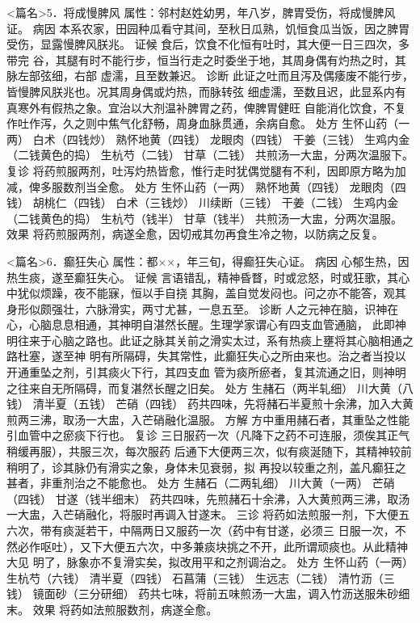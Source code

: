 \documentclass[a4paper,12pt,UTF8,twoside]{ctexbook}
\begin{document}
<篇名>5．将成慢脾风
属性：邻村赵姓幼男，年八岁，脾胃受伤，将成慢脾风证。 
病因 本系农家，田园种瓜看守其间，至秋日瓜熟，饥恒食瓜当饭，因之脾胃受伤，显露慢脾风朕兆。 
证候 食后，饮食不化恒有吐时，其大便一日三四次，多带完 
谷，其腿有时不能行步，恒当行走之时委坐于地，其周身偶有灼热之时，其脉左部弦细，右部 
虚濡，且至数兼迟。 
诊断 此证之吐而且泻及偶痿废不能行步，皆慢脾风朕兆也。况其周身偶或灼热，而脉转弦 
细虚濡，至数且迟，此显系内有真寒外有假热之象。宜治以大剂温补脾胃之药，俾脾胃健旺 
自能消化饮食，不复作吐作泻，久之则中焦气化舒畅，周身血脉贯通，余病自愈。 
处方 生怀山药（一两） 白术（四钱炒） 熟怀地黄（四钱） 龙眼肉（四钱） 
干姜（三钱） 生鸡内金（二钱黄色的捣） 生杭芍（二钱） 甘草（二钱） 
共煎汤一大盅，分两次温服下。 
复诊 将药煎服两剂，吐泻灼热皆愈，惟行走时犹偶觉腿有不利，因即原方略为加减，俾多服数剂当全愈。 
处方 生怀山药（一两） 熟怀地黄（四钱） 龙眼肉（四钱） 胡桃仁（四钱） 
白术（三钱炒） 川续断（三钱） 干姜（二钱） 生鸡内金（二钱黄色的捣） 
生杭芍（钱半） 甘草（钱半） 
共煎汤一大盅，分两次温服。 
效果 将药煎服两剂，病遂全愈，因切戒其勿再食生冷之物，以防病之反复。 

<篇名>6．癫狂失心
属性：都××，年三旬，得癫狂失心证。 
病因 心郁生热，因热生痰，遂至癫狂失心。 
证候 言语错乱，精神昏瞀，时或忿怒，时或狂歌，其心中犹似烦躁，夜不能寐，恒以手自挠 
其胸，盖自觉发闷也。问之亦不能答，观其身形似颇强壮，六脉滑实，两寸尤甚，一息五至。 
诊断 人之元神在脑，识神在心，心脑息息相通，其神明自湛然长醒。生理学家谓心有四支血管通脑， 
此即神明往来于心脑之路也。此证之脉其关前之滑实太过，系有热痰上壅将其心脑相通之路杜塞，遂至神 
明有所隔碍，失其常性，此癫狂失心之所由来也。治之者当投以开通重坠之剂，引其痰火下行，其四支血 
管为痰所瘀者，复其流通之旧，则神明之往来自无所隔碍，而复湛然长醒之旧矣。 
处方 生赭石（两半轧细） 川大黄（八钱） 清半夏（五钱） 芒硝（四钱） 
药共四味，先将赭石半夏煎十余沸，加入大黄煎两三沸，取汤一大盅，入芒硝融化温服。 
方解 方中重用赭石者，其重坠之性能引血管中之瘀痰下行也。 
复诊 三日服药一次（凡降下之药不可连服，须俟其正气稍缓再服），共服三次，每次服药 
后通下大便两三次，似有痰涎随下，其精神较前稍明了，诊其脉仍有滑实之象，身体未见衰弱，拟 
再投以较重之剂，盖凡癫狂之甚者，非重剂治之不能愈也。 
处方 生赭石（二两轧细） 川大黄（一两） 芒硝（四钱） 甘遂（钱半细末） 
药共四味，先煎赭石十余沸，入大黄煎两三沸，取汤一大盅，入芒硝融化，将服时再调入甘遂末。 
三诊 将药如法煎服一剂，下大便五六次，带有痰涎若干，中隔两日又服药一次（药中有甘遂，必须三 
日服一次，不然必作呕吐），又下大便五六次，中多兼痰块挑之不开，此所谓顽痰也。从此精神大见 
明了，脉象亦不复滑实矣，拟改用平和之剂调治之。 
处方 生怀山药（一两） 生杭芍（六钱） 清半夏（四钱） 石菖蒲（三钱） 
生远志（二钱） 清竹沥（三钱） 镜面砂（三分研细） 
药共七味，将前五味煎汤一大盅，调入竹沥送服朱砂细末。 
效果 将药如法煎服数剂，病遂全愈。 
\end{document}
